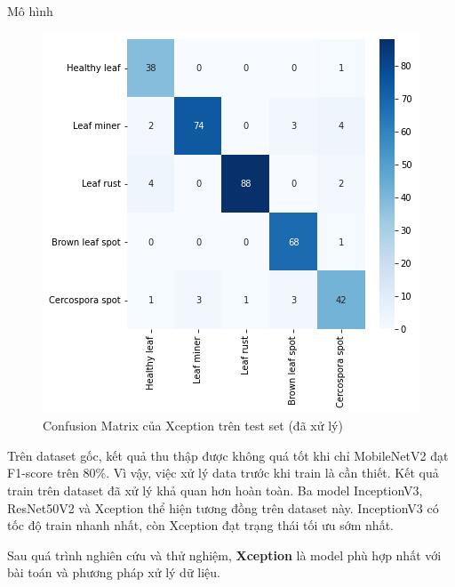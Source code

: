 \documentclass{beamer}
\begin{document}
\begin{frame}[allowframebreaks]{Mô hình}
	\begin{figure}[H]
		\centering
		\includegraphics[scale=0.4]{images/xception_matrix.png}
		\caption{Confusion Matrix của Xception trên test set (đã xử lý)}
	\end{figure}

	Trên dataset gốc, kết quả thu thập được không quá tốt khi chỉ MobileNetV2 đạt F1-score trên 80\%. Vì vậy, việc xử lý data trước khi train là cần thiết. Kết quả train trên dataset đã xử lý khả quan hơn hoàn toàn. Ba model InceptionV3, ResNet50V2 và Xception thể hiện tương đồng trên dataset này. InceptionV3 có tốc độ train nhanh nhất, còn Xception đạt trạng thái tối ưu sớm nhất.

	Sau quá trình nghiên cứu và thử nghiệm, \textbf{Xception} là model phù hợp nhất với bài toán và phương pháp xử lý dữ liệu.

\end{frame}
\end{document}
